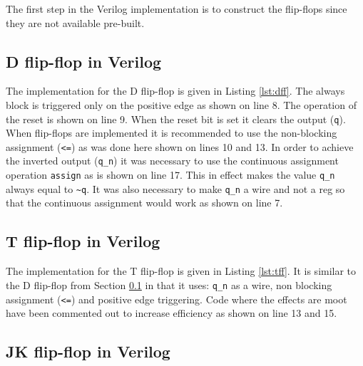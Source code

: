 \documentclass[12pt]{article}
\begin{document}
The first step in the Verilog implementation is to construct the flip-flops
since they are not available pre-built.

\subsection{D flip-flop in Verilog}
\label{sec:dff}

The implementation for the D flip-flop is given in Listing \ref{lst:dff}.
The always block is triggered only on the positive edge as shown
on line 8.
The operation of the reset is shown on line 9.
When the reset bit is set it clears the output (\verb+q+).
When flip-flops are implemented it is recommended to use the non-blocking
assignment (\verb+<=+) as was done here shown on lines 10 and 13.
In order to achieve the inverted output (\verb+q_n+) it was necessary
to use the continuous assignment operation \verb+assign+ as is shown
on line 17.
This in effect makes the value \verb+q_n+ always equal to
\verb+~q+.
It was also necessary to make \verb+q_n+ a wire and not a reg so that
the continuous assignment would work as shown on line 7.



\subsection{T flip-flop in Verilog}
\label{sec:tff}

The implementation for the T flip-flop is given in Listing \ref{lst:tff}.
It is similar to the D flip-flop from Section \ref{sec:dff} in that it
uses: \verb+q_n+ as a wire, non blocking assignment (\verb+<=+)
and positive edge triggering.
Code where the effects are moot have been commented out
to increase efficiency as shown on line 13 and 15.



\subsection{JK flip-flop in Verilog}
\end{document}
